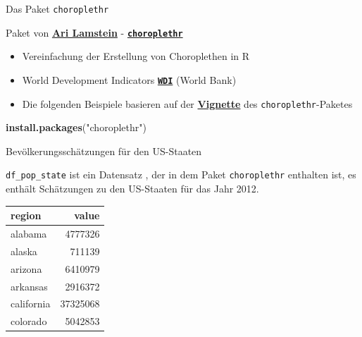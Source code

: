 \documentclass[ignorenonframetext,]{beamer}
\newenvironment{Shaded}{\begin{snugshade}}{\end{snugshade}}
\newcommand{\KeywordTok}[1]{\textcolor[rgb]{0.13,0.29,0.53}{\textbf{#1}}}
\newcommand{\NormalTok}[1]{#1}
\newcommand{\StringTok}[1]{\textcolor[rgb]{0.31,0.60,0.02}{#1}}
\begin{document}
\begin{frame}[fragile]{Das Paket \texttt{choroplethr}}
\protect\hypertarget{das-paket-choroplethr}{}

\begin{block}{Paket von \href{http://www.arilamstein.com/}{\textbf{Ari
Lamstein}} -
\href{https://cran.r-project.org/web/packages/choroplethr/index.html}{\textbf{\texttt{choroplethr}}}}

\begin{itemize}
\item
  Vereinfachung der Erstellung von Choroplethen in R
\item
  World Development Indicators
  \href{https://cran.r-project.org/web/packages/WDI/index.html}{\textbf{\texttt{WDI}}}
  (World Bank)
\item
  Die folgenden Beispiele basieren auf der
  \href{https://cran.r-project.org/web/packages/choroplethr/index.html}{\textbf{Vignette}}
  des \texttt{choroplethr}-Paketes
\end{itemize}

\begin{Shaded}
\begin{Highlighting}[]
\KeywordTok{install.packages}\NormalTok{(}\StringTok{"choroplethr"}\NormalTok{)}
\end{Highlighting}
\end{Shaded}

\end{block}

\end{frame}

\begin{frame}[fragile]{Bevölkerungsschätzungen für den US-Staaten}
\protect\hypertarget{bevolkerungsschatzungen-fur-den-us-staaten}{}

\texttt{df\_pop\_state} ist ein Datensatz , der in dem Paket
\texttt{choroplethr} enthalten ist, es enthält Schätzungen zu den
US-Staaten für das Jahr 2012.

\begin{longtable}[]{@{}lr@{}}
\toprule
region & value\tabularnewline
\midrule
\endhead
alabama & 4777326\tabularnewline
alaska & 711139\tabularnewline
arizona & 6410979\tabularnewline
arkansas & 2916372\tabularnewline
california & 37325068\tabularnewline
colorado & 5042853\tabularnewline
\bottomrule
\end{longtable}

\end{frame}
\end{document}
